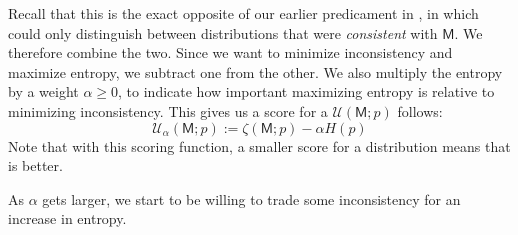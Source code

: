 \documentclass{article}
\newcommand{\sfM}{\mathsf M}
\numberwithin{equation}{section}
\begin{document}
\begin{notfocus}
	Recall that this is the exact opposite of our earlier
        predicament in , in which could
        only distinguish between distributions that were
        \emph{consistent} with $\sfM$. We therefore combine the
        two. Since we want to minimize inconsistency and maximize
        entropy, we subtract one from the other.  We also multiply the
        entropy by a weight $\alpha \ge 0$, to indicate how important
        maximizing entropy is relative to minimizing inconsistency.
        This gives us a score for a $\mathcal U(\sfM; p)$ 
        follows: 
	\begin{equation}
		\mathcal U_\alpha(\sfM; p) := \zeta(\sfM;p) - \alpha H(p) \label{eq:freeenergy-weighted}
	\end{equation}
Note that with this scoring function, a smaller score for a
distribution means that is better.

As $\alpha$ gets larger, we start to be willing to trade some
inconsistency for an increase in entropy.
	

\end{notfocus}
\end{document}
